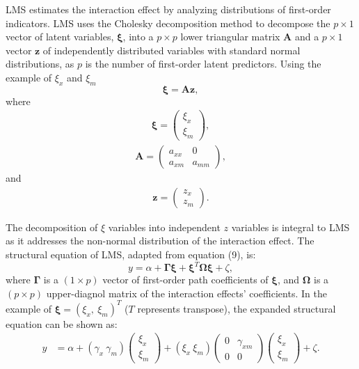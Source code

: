 \documentclass[
  11pt,
  man]{apa6}
\begin{document}
LMS estimates the interaction effect by analyzing distributions of first-order indicators. LMS uses the Cholesky decomposition method to decompose the \(p \times 1\) vector of latent variables, \(\mathbf{\xi}\), into a \(p \times p\) lower triangular matrix \(\mathbf{A}\) and a \(p \times 1\) vector \(\mathbf{z}\) of independently distributed variables with standard normal distributions, as \(p\) is the number of first-order latent predictors. Using the example of \(\xi_{x}\) and \(\xi_{m}\)
\begin{equation}
\mathbf{\xi} = \mathbf{A}\mathbf{z},
\end{equation}
where
\begin{align}
  \mathbf{\xi} =   
    \begin{pmatrix}
        \xi_{x} \\
        \xi_{m}
      \end{pmatrix},
\end{align}
\begin{align}
  \mathbf{A} =   
    \begin{pmatrix}
        a_{xx} & 0 \\
        a_{xm} & a_{mm}
      \end{pmatrix},
\end{align}
and
\begin{align}
  \mathbf{z} =   
    \begin{pmatrix}
        z_{x} \\
        z_{m}
      \end{pmatrix}.
\end{align}

The decomposition of \(\xi\) variables into independent \(z\) variables is integral to LMS as it addresses the non-normal distribution of the interaction effect. The structural equation of LMS, adapted from equation (9), is:
\begin{equation}
y = \alpha + \mathbf{\Gamma}\mathbf{\xi} + \mathbf{\xi}^T\mathbf{\Omega}\mathbf{\xi} + \zeta,
\end{equation}
where \(\mathbf{\Gamma}\) is a \((1 \times p)\) vector of first-order path coefficients of \(\mathbf{\xi}\), and \(\mathbf{\Omega}\) is a \((p \times p)\) upper-diagnol matrix of the interaction effects' coefficients. In the example of \(\mathbf{\xi} = (\xi_{x}, \ \xi_{m})^T\) (\(T\) represents transpose), the expanded structural equation can be shown as:
\begin{align}
    y &= \alpha + (\gamma_{x} \ \gamma_{m})
        \begin{pmatrix}
          \xi_{x} \\           
          \xi_{m}
        \end{pmatrix} +
        (\xi_{x} \ \xi_{m})
        \begin{pmatrix}
          0 & \gamma_{xm} \\           
          0 & 0
        \end{pmatrix}
        \begin{pmatrix}
          \xi_{x} \\           
          \xi_{m}
        \end{pmatrix} + 
    \zeta.
  \end{align}
\end{document}
